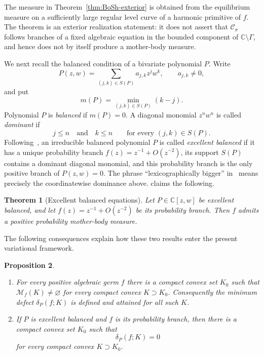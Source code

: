 \documentclass[reqno]{amsart}
\newtheorem{theorem}{Theorem}[section]
\newtheorem{proposition}[theorem]{Proposition}
\theoremstyle{definition}
\theoremstyle{remark}
\newcommand{\bC}{\mathbb C}
\newcommand{\M}{\mathcal M}
\newcommand{\Cauchy}{\mathcal C}
\begin{document}
The measure in Theorem~\ref{thm:BoSh-exterior} is obtained from the equilibrium
measure on a sufficiently large regular level curve of a harmonic primitive of
$f$.  The theorem is an exterior realization statement: it does not assert that
$\Cauchy_\sigma$ follows branches of a fixed algebraic equation in the bounded
component of $\bC\setminus\Gamma$, and hence does not by itself produce a
mother-body measure.

\medskip
We next recall the balanced condition of a bivariate polynomial $P$.  Write
\[
 P(z,w)=\sum_{(j,k)\in S(P)}a_{j,k}z^jw^k,
 \qquad a_{j,k}\ne0,
\]
and put
\[
 m(P)=\min_{(j,k)\in S(P)}(k-j).
\]
Polynomial $P$ is \emph{balanced} if $m(P)=0$.  A diagonal monomial $z^nw^n$
is called \emph{dominant} if
\[
 j\le n\quad\text{and}\quad k\le n
 \qquad\text{for every }(j,k)\in S(P).
\]
Following~\cite{BoSh}, an irreducible balanced polynomial $P$ is called
\emph{excellent balanced} if it has a unique probability branch
$f(z)=z^{-1}+O(z^{-2})$, its support $S(P)$ contains a dominant diagonal
monomial, and this probability branch is the only positive branch of $P(z,w)=0$.
The phrase ``lexicographically bigger'' in~\cite{BoSh} means precisely the
coordinatewise dominance above. \cite[Theorem~5]{BoSh} claims the following. 

\begin{theorem}[Excellent balanced equations] 
\label{thm:BoSh-excellent}
Let $P\in\bC[z,w]$ be excellent balanced, and let
$f(z)=z^{-1}+O(z^{-2})$ be its probability branch.  Then $f$ admits a positive
probability mother-body measure.
\end{theorem}

  The following consequences explain how these two
results enter the present variational framework.

\begin{proposition}\label{prop:BoSh-defect-connection}
\begin{enumerate}[label=\textup{(\roman*)}]
\item For every positive algebraic germ $f$ there is a compact convex set $K_0$
such that $\M_f(K)\ne\varnothing$ for every compact convex $K\supset K_0$.
Consequently the minimum defect $\delta_P(f;K)$ is defined and attained for all
such $K$.
\item If $P$ is excellent balanced and $f$ is its probability branch, then there
is a compact convex set $K_0$ such that
\[
 \delta_P(f;K)=0
\]
for every compact convex $K\supset K_0$.
\end{enumerate}
\end{proposition}
\end{document}

